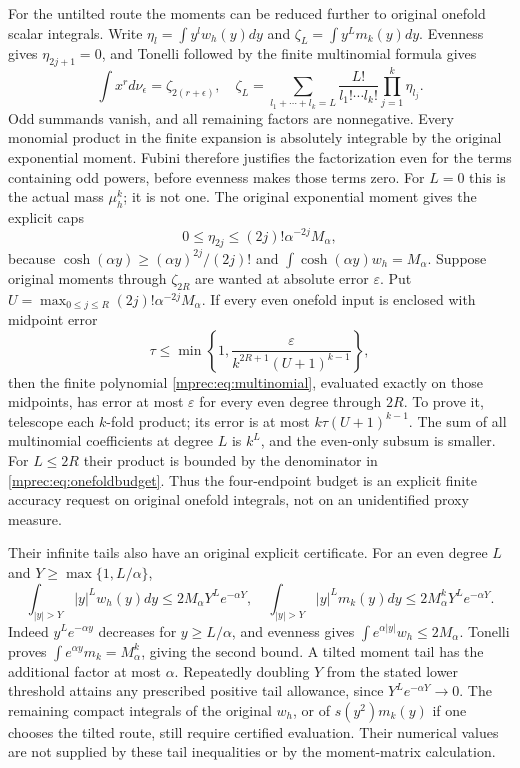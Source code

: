 For the untilted route the moments can be reduced further to
original onefold scalar integrals. Write
$\eta_l=\int y^lw_h(y)dy$ and
$\zeta_L=\int y^Lm_k(y)dy$. Evenness gives $\eta_{2j+1}=0$,
and Tonelli followed by the finite multinomial formula gives
\begin{equation}\label{mprec:eq:multinomial}
 \int x^r d\nu_\epsilon=\zeta_{2(r+\epsilon)},\quad
 \zeta_L=\sum_{l_1+\cdots+l_k=L}
 \frac{L!}{l_1!\cdots l_k!}\prod_{j=1}^k\eta_{l_j}.
\end{equation}
Odd summands vanish, and all remaining factors are nonnegative.
Every monomial product in the finite expansion is absolutely
integrable by the original exponential moment. Fubini therefore
justifies the factorization even for the terms containing odd
powers, before evenness makes those terms zero.
For $L=0$ this is the actual mass $\mu_h^k$; it is not one.
The original exponential moment gives the explicit caps
\begin{equation}\label{mprec:eq:etaone}
 0\le\eta_{2j}\le(2j)!\alpha^{-2j}M_\alpha,
\end{equation}
because $\cosh(\alpha y)\ge(\alpha y)^{2j}/(2j)!$ and
$\int\cosh(\alpha y)w_h=M_\alpha$.
Suppose original moments through $\zeta_{2R}$ are wanted at
absolute error $\varepsilon$. Put
$U=\max_{0\le j\le R}(2j)!\alpha^{-2j}M_\alpha$.
If every even onefold input is enclosed with midpoint error
\begin{equation}\label{mprec:eq:onefoldbudget}
 \tau\le\min\left\{1,
 \frac{\varepsilon}{k^{2R+1}(U+1)^{k-1}}\right\},
\end{equation}
then the finite polynomial \eqref{mprec:eq:multinomial}, evaluated
exactly on those midpoints, has error at most $\varepsilon$
for every even degree through $2R$. To prove it, telescope each
$k$-fold product; its error is at most
$k\tau(U+1)^{k-1}$. The sum of all multinomial coefficients
at degree $L$ is $k^L$, and the even-only subsum is smaller.
For $L\le2R$ their product is bounded by the denominator in
\eqref{mprec:eq:onefoldbudget}. Thus the four-endpoint budget is an
explicit finite accuracy request on original onefold integrals,
not on an unidentified proxy measure.

Their infinite tails also have an original explicit certificate.
For an even degree $L$ and $Y\ge\max\{1,L/\alpha\}$,
\begin{equation}\label{mprec:eq:tail}
 \int_{|y|>Y}|y|^Lw_h(y)dy
 \le2M_\alpha Y^Le^{-\alpha Y},\quad
 \int_{|y|>Y}|y|^Lm_k(y)dy
 \le2M_\alpha^kY^Le^{-\alpha Y}.
\end{equation}
Indeed $y^Le^{-\alpha y}$ decreases for $y\ge L/\alpha$,
and evenness gives $\int e^{\alpha|y|}w_h\le2M_\alpha$.
Tonelli proves $\int e^{\alpha y}m_k=M_\alpha^k$, giving
the second bound. A tilted moment tail has the additional factor
at most $\alpha$. Repeatedly doubling $Y$ from the stated lower
threshold attains any prescribed positive tail allowance, since
$Y^Le^{-\alpha Y}\to0$. The remaining compact integrals of
the original $w_h$, or of $s(y^2)m_k(y)$ if one chooses the
tilted route, still require certified evaluation. Their numerical
values are not supplied by these tail inequalities or by the
moment-matrix calculation.

